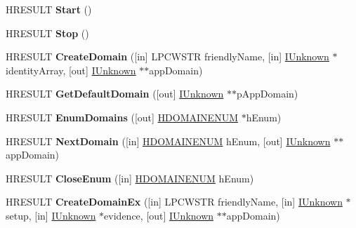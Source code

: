\begin{DoxyCompactItemize}
H\+R\+E\+S\+U\+LT {\bfseries Start} ()
\item 
\mbox{\label{interface_i_cor_runtime_host_a4a081ecc1f774bba78189683c48399ef}} 
H\+R\+E\+S\+U\+LT {\bfseries Stop} ()
\item 
\mbox{\label{interface_i_cor_runtime_host_a488b2d2e4725838b6469cfe4872d27bd}} 
H\+R\+E\+S\+U\+LT {\bfseries Create\+Domain} (\mbox{[}in\mbox{]} L\+P\+C\+W\+S\+TR friendly\+Name, \mbox{[}in\mbox{]} \hyperlink{interface_i_unknown}{I\+Unknown} $\ast$identity\+Array, \mbox{[}out\mbox{]} \hyperlink{interface_i_unknown}{I\+Unknown} $\ast$$\ast$app\+Domain)
\item 
\mbox{\label{interface_i_cor_runtime_host_ab627262a82ad94e45bb7391875fffe87}} 
H\+R\+E\+S\+U\+LT {\bfseries Get\+Default\+Domain} (\mbox{[}out\mbox{]} \hyperlink{interface_i_unknown}{I\+Unknown} $\ast$$\ast$p\+App\+Domain)
\item 
\mbox{\label{interface_i_cor_runtime_host_aa4e9b08c278e847e7a056904a8b03b21}} 
H\+R\+E\+S\+U\+LT {\bfseries Enum\+Domains} (\mbox{[}out\mbox{]} \hyperlink{interfacevoid}{H\+D\+O\+M\+A\+I\+N\+E\+N\+UM} $\ast$h\+Enum)
\item 
\mbox{\label{interface_i_cor_runtime_host_a23cfa678b6bdfc0c8a93ac5fd9e1e439}} 
H\+R\+E\+S\+U\+LT {\bfseries Next\+Domain} (\mbox{[}in\mbox{]} \hyperlink{interfacevoid}{H\+D\+O\+M\+A\+I\+N\+E\+N\+UM} h\+Enum, \mbox{[}out\mbox{]} \hyperlink{interface_i_unknown}{I\+Unknown} $\ast$$\ast$app\+Domain)
\item 
\mbox{\label{interface_i_cor_runtime_host_a5f45c032d2b2a8288ca20aa920857660}} 
H\+R\+E\+S\+U\+LT {\bfseries Close\+Enum} (\mbox{[}in\mbox{]} \hyperlink{interfacevoid}{H\+D\+O\+M\+A\+I\+N\+E\+N\+UM} h\+Enum)
\item 
\mbox{\label{interface_i_cor_runtime_host_ae32290bee7aa7883c0e6ad16701c81bf}} 
H\+R\+E\+S\+U\+LT {\bfseries Create\+Domain\+Ex} (\mbox{[}in\mbox{]} L\+P\+C\+W\+S\+TR friendly\+Name, \mbox{[}in\mbox{]} \hyperlink{interface_i_unknown}{I\+Unknown} $\ast$setup, \mbox{[}in\mbox{]} \hyperlink{interface_i_unknown}{I\+Unknown} $\ast$evidence, \mbox{[}out\mbox{]} \hyperlink{interface_i_unknown}{I\+Unknown} $\ast$$\ast$app\+Domain)

\end{DoxyCompactItemize}
